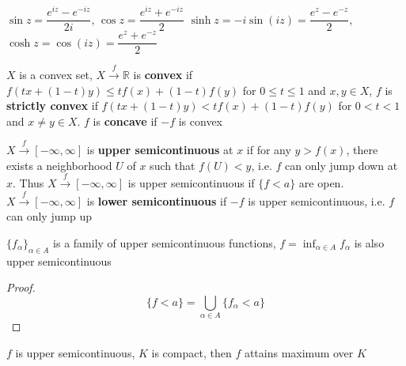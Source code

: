 \documentclass[main]{subfiles}
\begin{document}
\begin{definition}
$\sin z=\dfrac{e^{iz}-e^{-iz}}{2i}$, $\cos z=\dfrac{e^{iz}+e^{-iz}}{2}$
$\sinh z=-i\sin(iz)=\dfrac{e^z-e^{-z}}{2}$, $\cosh z=\cos(iz)=\dfrac{e^z+e^{-z}}{2}$
\end{definition}

\begin{definition}
$X$ is a convex set, $X\xrightarrow f\mathbb R$ is \textbf{convex} if $f(tx+(1-t)y)\leq tf(x)+(1-t)f(y)$ for $0\leq t\leq1$ and $x,y\in X$, $f$ is \textbf{strictly convex} if $f(tx+(1-t)y)< tf(x)+(1-t)f(y)$ for $0<t<1$ and $x\neq y\in X$. $f$ is \textbf{concave} if $-f$ is convex
\end{definition}

\begin{definition}
$X\xrightarrow{f}[-\infty,\infty]$ is \textbf{upper semicontinuous} at $x$ if for any $y>f(x)$, there exists a neighborhood $U$ of $x$ such that $f(U)<y$, i.e. $f$ can only jump down at $x$. Thus $X\xrightarrow{f}[-\infty,\infty]$ is upper semicontinuous if $\{f<a\}$ are open. $X\xrightarrow{f}[-\infty,\infty]$ is \textbf{lower semicontinuous} if $-f$ is upper semicontinuous, i.e. $f$ can only jump up
\begin{center}
\end{center}
\end{definition}

\begin{lemma}
$\{f_{\alpha}\}_{\alpha\in A}$ is a family of upper semicontinuous functions, $\displaystyle f=\inf_{\alpha\in A}f_{\alpha}$ is also upper semicontinuous
\end{lemma}

\begin{proof}
\[\{f<a\}=\bigcup_{\alpha\in A}\{f_{\alpha}<a\}\]
\end{proof}

\begin{lemma}
$f$ is upper semicontinuous, $K$ is compact, then $f$ attains maximum over $K$
\end{lemma}
\end{document}
